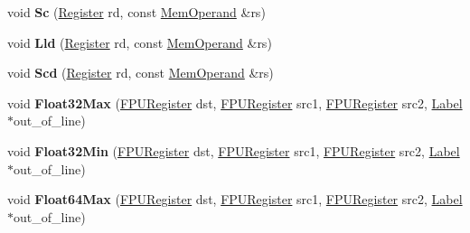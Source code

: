 \begin{DoxyCompactItemize}
\item 
\mbox{\label{classv8_1_1internal_1_1TurboAssembler_ab699c0bcc8a92a867693a17b069db297}} 
void {\bfseries Sc} (\mbox{\hyperlink{classv8_1_1internal_1_1Register}{Register}} rd, const \mbox{\hyperlink{classv8_1_1internal_1_1MemOperand}{Mem\+Operand}} \&rs)
\item 
\mbox{\label{classv8_1_1internal_1_1TurboAssembler_a1e028f3da70c9a03d6bf1a2dca5e8889}} 
void {\bfseries Lld} (\mbox{\hyperlink{classv8_1_1internal_1_1Register}{Register}} rd, const \mbox{\hyperlink{classv8_1_1internal_1_1MemOperand}{Mem\+Operand}} \&rs)
\item 
\mbox{\label{classv8_1_1internal_1_1TurboAssembler_a139be35706a73afe6c386664dd182187}} 
void {\bfseries Scd} (\mbox{\hyperlink{classv8_1_1internal_1_1Register}{Register}} rd, const \mbox{\hyperlink{classv8_1_1internal_1_1MemOperand}{Mem\+Operand}} \&rs)
\item 
\mbox{\label{classv8_1_1internal_1_1TurboAssembler_a6d07c91604ec7dad8b3fbf11f246d0c3}} 
void {\bfseries Float32\+Max} (\mbox{\hyperlink{classv8_1_1internal_1_1FPURegister}{F\+P\+U\+Register}} dst, \mbox{\hyperlink{classv8_1_1internal_1_1FPURegister}{F\+P\+U\+Register}} src1, \mbox{\hyperlink{classv8_1_1internal_1_1FPURegister}{F\+P\+U\+Register}} src2, \mbox{\hyperlink{classv8_1_1internal_1_1Label}{Label}} $\ast$out\+\_\+of\+\_\+line)
\item 
\mbox{\label{classv8_1_1internal_1_1TurboAssembler_a6f94494f0ef3b0446a0262e6cdf7f70b}} 
void {\bfseries Float32\+Min} (\mbox{\hyperlink{classv8_1_1internal_1_1FPURegister}{F\+P\+U\+Register}} dst, \mbox{\hyperlink{classv8_1_1internal_1_1FPURegister}{F\+P\+U\+Register}} src1, \mbox{\hyperlink{classv8_1_1internal_1_1FPURegister}{F\+P\+U\+Register}} src2, \mbox{\hyperlink{classv8_1_1internal_1_1Label}{Label}} $\ast$out\+\_\+of\+\_\+line)
\item 
\mbox{\label{classv8_1_1internal_1_1TurboAssembler_a40c0cfa9cb4ceb7c18ecf8f4328114ba}} 
void {\bfseries Float64\+Max} (\mbox{\hyperlink{classv8_1_1internal_1_1FPURegister}{F\+P\+U\+Register}} dst, \mbox{\hyperlink{classv8_1_1internal_1_1FPURegister}{F\+P\+U\+Register}} src1, \mbox{\hyperlink{classv8_1_1internal_1_1FPURegister}{F\+P\+U\+Register}} src2, \mbox{\hyperlink{classv8_1_1internal_1_1Label}{Label}} $\ast$out\+\_\+of\+\_\+line)

\end{DoxyCompactItemize}

